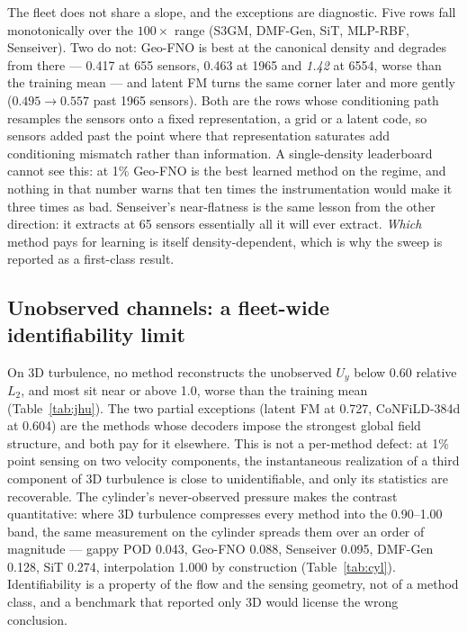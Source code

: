 \documentclass[aip,pof,reprint,amsmath,amssymb,superscriptaddress]{revtex4-1}
\newcommand{\dmfgen}{DMF-Gen}
\begin{document}
The fleet does not share a slope, and the exceptions are diagnostic. Five
rows fall monotonically over the $100\times$ range (S3GM, \dmfgen{}, SiT,
MLP-RBF, Senseiver). Two do not: Geo-FNO is best at the canonical density and
degrades from there --- 0.417 at 655 sensors, 0.463 at 1965 and \emph{1.42}
at 6554, worse than the training mean --- and latent FM turns the same corner
later and more gently ($0.495\!\to\!0.557$ past 1965 sensors). Both are the
rows whose conditioning path resamples the sensors onto a fixed
representation, a grid or a latent code, so sensors added past the point
where that representation saturates add conditioning mismatch rather than
information. A single-density leaderboard cannot see this: at 1\% Geo-FNO is
the best learned method on the regime, and nothing in that number warns that
ten times the instrumentation would make it three times as bad. Senseiver's
near-flatness is the same lesson from the other direction: it extracts at 65
sensors essentially all it will ever extract. \emph{Which} method pays for
learning is itself density-dependent, which is why the sweep is reported as a
first-class result.

\subsection{Unobserved channels: a fleet-wide identifiability
limit}\label{sec:identifiability}

On 3D turbulence, no method reconstructs the unobserved $U_y$ below 0.60
relative $L_2$, and most sit near or above 1.0, worse than the training mean
(Table~\ref{tab:jhu}). The two partial exceptions (latent FM at 0.727,
CoNFiLD-384d at 0.604) are the methods whose decoders impose the strongest
global field structure, and both pay for it elsewhere. This is not a
per-method defect: at 1\% point sensing on two velocity components, the
instantaneous realization of a third component of 3D turbulence is close to
unidentifiable, and only its statistics are recoverable. The cylinder's
never-observed pressure makes the contrast quantitative: where 3D turbulence
compresses every method into the 0.90--1.00 band, the same measurement on the
cylinder spreads them over an order of magnitude --- gappy POD 0.043, Geo-FNO
0.088, Senseiver 0.095, \dmfgen{} 0.128, SiT 0.274, interpolation 1.000 by
construction (Table~\ref{tab:cyl}). Identifiability is a property of the flow
and the sensing geometry, not of a method class, and a benchmark that
reported only 3D would license the wrong conclusion.
\end{document}
